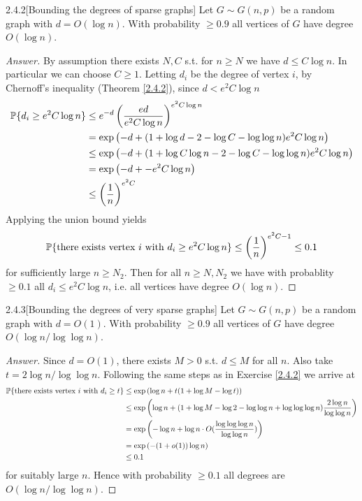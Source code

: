 {\begin{ex}{2.4.2}[Bounding the degrees of sparse graphs]\label{2.4.2} 
Let $G \sim G(n,p)$ be a random graph with $d = O(\log n)$. With probability $\geq 0.9$ all vertices of $G$ have degree $O(\log n)$.
\end{ex}
\begin{proof}[Answer]
By assumption there exists $N, C$ s.t. for $n\geq N$ we have $d \leq C \log n$. In particular we can choose $C \geq 1$. Letting $d_i$ be the degree of vertex $i$, by Chernoff's inequality (Theorem \ref{2.4.2}), since $d < e^2C\log n$
\begin{align*}
    \mathbb{P} \{ d_i \geq e^2C\log n\} &\leq e^{-d}\left(\frac  {ed} {e^2C\log n}\right)^{e^2C\log n} \\
    &= \exp \left( -d + (1 + \log d -2 - \log C - \log\log n)e^2C\log n\right) \\
    &\leq \exp \left( -d + (1 + \log C\log n -2 - \log C - \log\log n)e^2C\log n\right) \\
    &= \exp \left( -d + -e^2C\log n\right) \\
    &\leq \left(\frac 1 n\right)^{e^2 C}
\end{align*}
Applying the union bound yields
\begin{align*}
    \mathbb{P} \{ \text{there exists vertex $i$ with } d_i \geq e^2C\log n\} \leq \left(\frac 1 n\right)^{e^2 C -1} \leq 0.1
\end{align*}
for sufficiently large $n \geq N_2$. Then for all $n \geq N, N_2$ we have with probablity $\geq 0.1$ all $d_i \leq e^2C\log n$, i.e. all vertices have degree $O(\log n)$.
\end{proof}

\begin{ex}{2.4.3}[Bounding the degrees of very sparse graphs]\label{2.4.3} 
Let $G \sim G(n,p)$ be a random graph with $d = O(1)$. With probability $\geq 0.9$ all vertices of $G$ have degree $O(\log n/\log\log n)$.
\end{ex}
\begin{proof}[Answer]
Since $d = O(1)$, there exists $M>0$ s.t. $d \leq M$ for all $n$. Also take $t = 2 \log n / \log\log n$.
Following the same steps as in Exercise \ref{2.4.2} we arrive at
\begin{align*}
\mathbb{P} \{ \text{there exists vertex $i$ with } d_i \geq t \} &\leq \exp \left(\log n + t(1 + \log M - \log t) \right) \\
&\leq \exp \left(\log n + (1+ \log M -\log 2 - \log\log n + \log\log\log n)\frac {2\log n} {\log\log n}\right) \\
&= \exp \left( - \log n + \log n \cdot O(\frac{\log\log\log n} {\log \log n})\right) \\
&= \exp \left(-(1 + o(1))\log n\right) \\
&\leq 0.1
\end{align*}
for suitably large $n$. Hence with probability $\geq 0.1$ all degrees are $O(\log n / \log\log n)$.
\end{proof}

}
